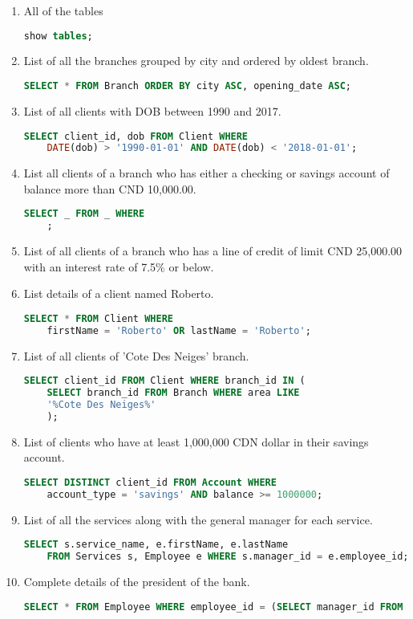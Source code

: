 \documentclass[letterpaper, 12pt]{article}
\begin{document}
\begin{enumerate}[label=\arabic*.]
  \item All of the tables
    \begin{lstlisting}[language=sql]
show tables;
  \end{lstlisting}
  \item List of all the branches grouped by city and ordered by oldest branch.
    \begin{lstlisting}[language=sql]
SELECT * FROM Branch ORDER BY city ASC, opening_date ASC;
  \end{lstlisting}
  \item List of all clients with DOB between 1990 and 2017.
    \begin{lstlisting}[language=sql]
SELECT client_id, dob FROM Client WHERE 
	DATE(dob) > '1990-01-01' AND DATE(dob) < '2018-01-01';
  \end{lstlisting}
  \item List all clients of a branch who has either a checking or savings account of balance more than CND 10,000.00.
    \begin{lstlisting}[language=sql]
SELECT _ FROM _ WHERE 
	;
  \end{lstlisting}
  \item List of all clients of a branch who has a line of credit of limit CND 25,000.00 with an interest rate of 7.5\% or below.
  \item List details of a client named Roberto.
    \begin{lstlisting}[language=sql]
SELECT * FROM Client WHERE 
	firstName = 'Roberto' OR lastName = 'Roberto';
  \end{lstlisting}
  \item List of all clients of 'Cote Des Neiges' branch.
    \begin{lstlisting}[language=sql]
SELECT client_id FROM Client WHERE branch_id IN (
	SELECT branch_id FROM Branch WHERE area LIKE
	'%Cote Des Neiges%'
    );
  \end{lstlisting}
  \item List of clients who have at least 1,000,000 CDN dollar in their savings account.
    \begin{lstlisting}[language=sql]
SELECT DISTINCT client_id FROM Account WHERE 
	account_type = 'savings' AND balance >= 1000000;
  \end{lstlisting}
  \item List of all the services along with the general manager for each service.
    \begin{lstlisting}[language=sql]
SELECT s.service_name, e.firstName, e.lastName 
	FROM Services s, Employee e WHERE s.manager_id = e.employee_id;
  \end{lstlisting}
  \item Complete details of the president of the bank.
    \begin{lstlisting}[language=sql]
SELECT * FROM Employee WHERE employee_id = (SELECT manager_id FROM Branch WHERE isHeadOffice = 1);
  \end{lstlisting}

\end{enumerate}
\end{document}
